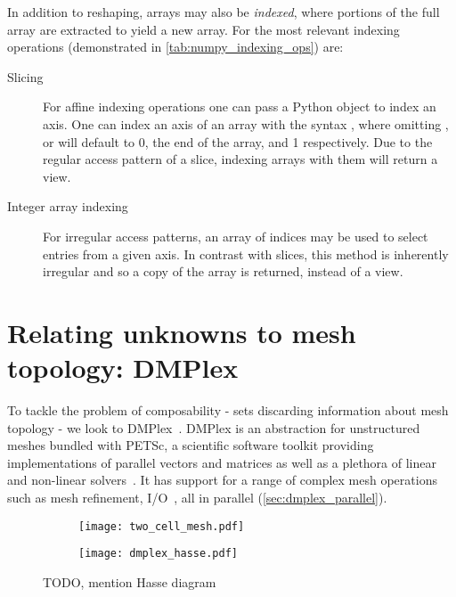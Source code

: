 \documentclass[thesis]{subfiles}
\begin{document}
In addition to reshaping, arrays may also be \textit{indexed}, where portions of the full array are extracted to yield a new array.
For  the most relevant indexing operations (demonstrated in \cref{tab:numpy_indexing_ops}) are:

\begin{description}
  \item[Slicing]
    For affine indexing operations one can pass a Python  object to index an axis.
    One can index an axis of an array with the syntax , where omitting ,  or  will default to 0, the end of the array, and 1 respectively.
    Due to the regular access pattern of a slice, indexing \numpy arrays with them will return a view.

  \item[Integer array indexing]
    For irregular access patterns, an array of indices may be used to select entries from a given axis.
    In contrast with slices, this method is inherently irregular and so a copy of the array is returned, instead of a view.
\end{description}

\section{Relating unknowns to mesh topology: DMPlex}
\label{sec:foundations_dmplex}

To tackle the problem of composability - sets discarding information about mesh topology - we look to DMPlex~\cite{knepleyMeshAlgorithmsPDE2009,langeEfficientMeshManagement2016,knepleyUnstructuredOverlappingMesh2015}.
DMPlex is an abstraction for unstructured meshes bundled with PETSc, a scientific software toolkit providing implementations of parallel vectors and matrices as well as a plethora of linear and non-linear solvers~\cite{petsc-web-page,petsc-user-ref,petsc-efficient}.
It has support for a range of complex mesh operations such as mesh refinement, I/O~\cite{hamEfficientNtoMCheckpointing2024}, all in parallel (\cref{sec:dmplex_parallel}).  %

\begin{figure}
  \centering
  \begin{subfigure}{.49\textwidth}
    \centering
    \texttt{[image: two\_cell\_mesh.pdf]}
  \end{subfigure}
  \begin{subfigure}{.49\textwidth}
    \centering
    \texttt{[image: dmplex\_hasse.pdf]}
  \end{subfigure}
  \caption{TODO, mention Hasse diagram}
  \label{fig:dmplex_hasse}
\end{figure}
\end{document}
